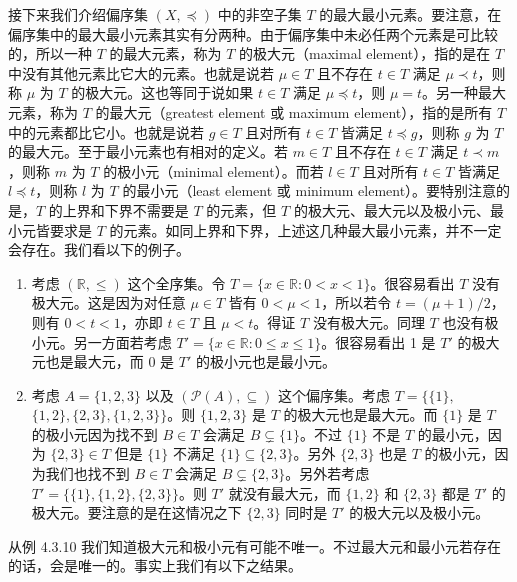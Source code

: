 接下来我们介绍偏序集 $(X, \preceq)$ 中的非空子集 $T$ 的最大最小元素。要注意，在偏序集中的最大最小元素其实有分两种。由于偏序集中未必任两个元素是可比较的，所以一种 $T$ 的最大元素，称为 $T$ 的极大元（maximal element），指的是在 $T$ 中没有其他元素比它大的元素。也就是说若 $\mu \in T$ 且不存在 $t \in T$ 满足 $\mu \prec t$，则称 $\mu$ 为 $T$ 的极大元。这也等同于说如果 $t \in T$ 满足 $\mu \preceq t$，则 $\mu = t$。另一种最大元素，称为 $T$ 的最大元（greatest element 或 maximum element），指的是所有 $T$ 中的元素都比它小。也就是说若 $g \in T$ 且对所有 $t \in T$ 皆满足 $t \preceq g$，则称 $g$ 为 $T$ 的最大元。至于最小元素也有相对的定义。若 $m \in T$ 且不存在 $t \in T$ 满足 $t \prec m$，则称 $m$ 为 $T$ 的极小元（minimal element）。而若 $l \in T$ 且对所有 $t \in T$ 皆满足 $l \preceq t$，则称 $l$ 为 $T$ 的最小元（least element 或 minimum element）。要特别注意的是，$T$ 的上界和下界不需要是 $T$ 的元素，但 $T$ 的极大元、最大元以及极小元、最小元皆要求是 $T$ 的元素。如同上界和下界，上述这几种最大最小元素，并不一定会存在。我们看以下的例子。

\begin{example}
\begin{enumerate}
    \item 考虑 $(\mathbb{R}, \leq)$ 这个全序集。令 $T = \{x \in \mathbb{R} : 0 < x < 1\}$。很容易看出 $T$ 没有极大元。这是因为对任意 $\mu \in T$ 皆有 $0 < \mu < 1$，所以若令 $t = (\mu + 1)/2$，则有 $0 < t < 1$，亦即 $t \in T$ 且 $\mu < t$。得证 $T$ 没有极大元。同理 $T$ 也没有极小元。另一方面若考虑 $T' = \{x \in \mathbb{R} : 0 \leq x \leq 1\}$。很容易看出 1 是 $T'$ 的极大元也是最大元，而 0 是 $T'$ 的极小元也是最小元。
    \item 考虑 $A = \{1, 2, 3\}$ 以及 $(\mathcal{P}(A), \subseteq)$ 这个偏序集。考虑 $T = \{\{1\},$ $ \{1, 2\}, \{2, 3\}, \{1, 2, 3\}\}$。则 $\{1, 2, 3\}$ 是 $T$ 的极大元也是最大元。而 $\{1\}$ 是 $T$ 的极小元因为找不到 $B \in T$ 会满足 $B \subsetneq \{1\}$。不过 $\{1\}$ 不是 $T$ 的最小元，因为 $\{2, 3\} \in T$ 但是 $\{1\}$ 不满足 $\{1\} \subseteq \{2, 3\}$。另外 $\{2, 3\}$ 也是 $T$ 的极小元，因为我们也找不到 $B \in T$ 会满足 $B \subsetneq \{2, 3\}$。另外若考虑 $T' = \{\{1\}, \{1, 2\}, \{2, 3\}\}$。则 $T'$ 就没有最大元，而 $\{1, 2\}$ 和 $\{2, 3\}$ 都是 $T'$ 的极大元。要注意的是在这情况之下 $\{2, 3\}$ 同时是 $T'$ 的极大元以及极小元。
\end{enumerate}
\end{example}

从例 4.3.10 我们知道极大元和极小元有可能不唯一。不过最大元和最小元若存在的话，会是唯一的。事实上我们有以下之结果。

